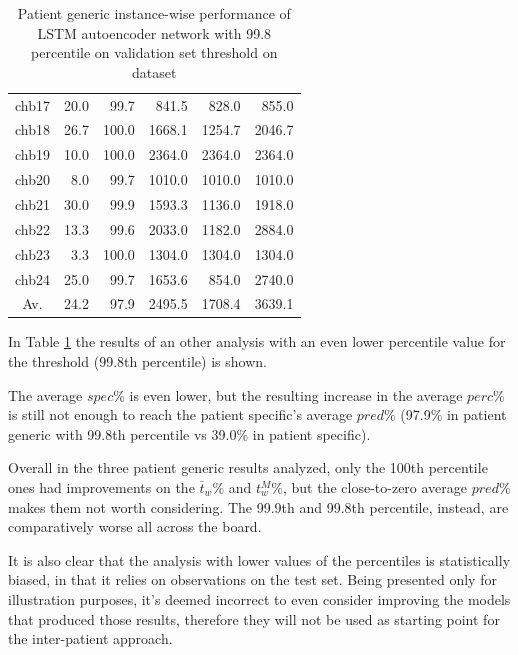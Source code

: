 \begin{table}[ht]
\begin{tabular}{c|rrrrr}
    chb17   & 20.0   & 99.7   & 841.5   & 828.0   & 855.0   \\
    chb18   & 26.7   & 100.0  & 1668.1  & 1254.7  & 2046.7  \\
    chb19   & 10.0   & 100.0  & 2364.0  & 2364.0  & 2364.0  \\
    chb20   & 8.0    & 99.7   & 1010.0  & 1010.0  & 1010.0  \\
    chb21   & 30.0   & 99.9   & 1593.3  & 1136.0  & 1918.0  \\
    chb22   & 13.3   & 99.6   & 2033.0  & 1182.0  & 2884.0  \\
    chb23   & 3.3    & 100.0  & 1304.0  & 1304.0  & 1304.0  \\
    chb24   & 25.0   & 99.7   & 1653.6  & 854.0   & 2740.0  \\ \hline
    Av.     & 24.2   & 97.9   & 2495.5  & 1708.4  & 3639.1  \\ \hline
    \end{tabular}
    \caption{Patient generic instance-wise performance of LSTM autoencoder network with 99.8 percentile on validation set threshold on  dataset}
    \label{tab:patient-generic-99.8perc-lstm-instance} 
\end{table}

In Table \ref{tab:patient-generic-99.8perc-lstm-instance} the results of an other analysis with an even lower percentile value for the threshold (99.8th percentile) is shown.

The average $spec\%$ is even lower, but the resulting increase in the average $perc\%$ is still not enough to reach the patient specific's average $pred\%$ (97.9\% in patient generic with 99.8th percentile vs 39.0\% in patient specific).

Overall in the three patient generic results analyzed, only the 100th percentile ones had improvements on the $\overline{t}_w\%$ and $t_w^M\%$, but the close-to-zero average $pred\%$ makes them not worth considering. The 99.9th and 99.8th percentile, instead, are comparatively worse all across the board.

It is also clear that the analysis with lower values of the percentiles is statistically biased, in that it relies on observations on the test set. Being presented only for illustration purposes, it's deemed incorrect to even consider improving the models that produced those results, therefore they will not be used as starting point for the inter-patient approach.

